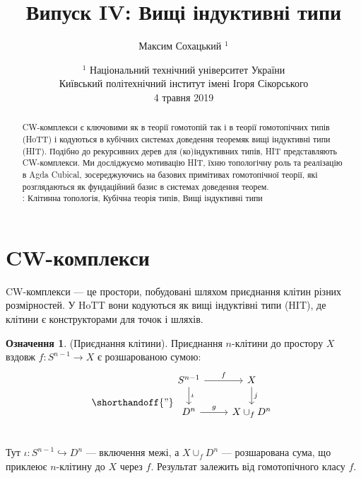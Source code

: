 \documentclass{article}
\theoremstyle{definition}
\newtheorem{definition}{Означення}
\newcommand*{\incmap}{\hookrightarrow}
\begin{document}
\title{Випуск IV: Вищі індуктивні типи}
\author{Максим Сохацький $^1$}
\date{ $^1$ Національний технічний університет України \\
       \small Київський політехнічний інститут імені Ігоря Сікорського \\
       4 травня 2019 }
\maketitle

\begin{abstract}
CW-комплекси є ключовими як в теорії гомотопій так і в теорії гомотопічних типів (HoTT) і кодуються
в кубічних системах доведення теоремяк вищі індуктивні типи (HIT). Подібно до
рекурсивних дерев для (ко)індуктивних типів, HIT представляють CW-комплекси.
Ми досліджуємо мотивацію HIT, їхню топологічну роль та реалізацію в Agda Cubical,
зосереджуючись на базових примітивах гомотопічної теорії, які розглядаються як фундаційний базис
в системах доведення теорем. \\
: Клітинна топологія, Кубічна теорія типів, Вищі індуктивні типи
\end{abstract}

\tableofcontents

\section{CW-комплекси}
CW-комплекси — це простори, побудовані шляхом приєднання клітин різних
розмірностей. У HoTT вони кодуються як вищі індуктівні типи (HIT),
де клітини є конструкторами для точок і шляхів.

\begin{definition} (Приєднання клітини).
Приєднання $n$-клітини до простору \( X \)
вздовж \( f : S^{n-1} \to X \) є розшарованою сумою:
\[
\shorthandoff{"}
\begin{tikzcd}
S^{n-1} \arrow[r, "f"] \arrow[d, "\iota"] & X \arrow[d, "j"] \\
D^n \arrow[r, "g"]                        & X \cup_f D^n \\
\end{tikzcd}
\]
Тут \( \iota : S^{n-1} \incmap D^n \) — включення межі,
а \( X \cup_f D^n \) — розшарована сума, що приклеює \( n \)-клітину до \( X \) через \( f \). Результат залежить від
гомотопічного класу \( f \).
\end{definition}
\end{document}
